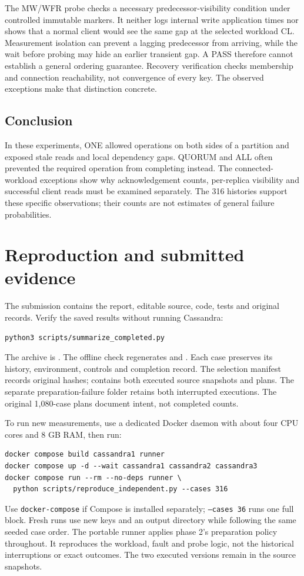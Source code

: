 \documentclass[lang=en,11pt,a4paper,bibend=bibtex]{elegantpaper}
\begin{document}
The MW/WFR probe checks a necessary predecessor-visibility condition under controlled immutable markers. It neither logs internal write application times nor shows that a normal client would see the same gap at the selected workload CL. Measurement isolation can prevent a lagging predecessor from arriving, while the wait before probing may hide an earlier transient gap. A PASS therefore cannot establish a general ordering guarantee. Recovery verification checks membership and connection reachability, not convergence of every key. The observed exceptions make that distinction concrete.

\subsection{Conclusion}
In these experiments, ONE allowed operations on both sides of a partition and exposed stale reads and local dependency gaps. QUORUM and ALL often prevented the required operation from completing instead. The connected-workload exceptions show why acknowledgement counts, per-replica visibility and successful client reads must be examined separately. The 316 histories support these specific observations; their counts are not estimates of general failure probabilities.

\clearpage
\section{Reproduction and submitted evidence}
The submission contains the report, editable source, code, tests and original records. Verify the saved results without running Cassandra:
\begin{lstlisting}
python3 scripts/summarize_completed.py
\end{lstlisting}
The archive is . The offline check regenerates  and . Each case preserves its history, environment, controls and completion record. The selection manifest records original hashes;  contains both executed source snapshots and plans. The separate preparation-failure folder retains both interrupted executions. The original 1,080-case plans document intent, not completed counts.

To run new measurements, use a dedicated Docker daemon with about four CPU cores and 8 GB RAM, then run:
\begin{lstlisting}
docker compose build cassandra1 runner
docker compose up -d --wait cassandra1 cassandra2 cassandra3
docker compose run --rm --no-deps runner \
  python scripts/reproduce_independent.py --cases 316
\end{lstlisting}
Use \texttt{docker-compose} if Compose is installed separately; \texttt{--cases 36} runs one full block. Fresh runs use new keys and an output directory while following the same seeded case order. The portable runner applies phase 2's preparation policy throughout. It reproduces the workload, fault and probe logic, not the historical interruptions or exact outcomes. The two executed versions remain in the source snapshots.
\end{document}
